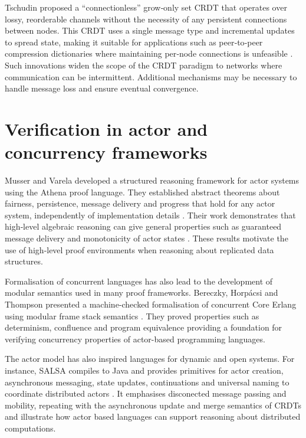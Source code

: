 Tschudin proposed a ``connectionless'' grow‑only set CRDT that operates over lossy, reorderable channels without the necessity of any persistent connections between nodes. This CRDT uses a single message type and incremental updates to spread state, making it suitable for applications such as peer‑to‑peer compression dictionaries where maintaining per‑node connections is unfeasible \cite{tschudin2022connectionless}. Such innovations widen the scope of the CRDT paradigm to networks where communication can be intermittent. Additional mechanisms may be necessary to handle message loss and ensure eventual convergence.


\section{Verification in actor and concurrency frameworks}

Musser and Varela developed a structured reasoning framework for actor systems using the Athena proof language. They established abstract theorems about fairness, persistence, message delivery and progress that hold for any actor system, independently of implementation details \cite{musser2013structured}. Their work demonstrates that high‐level algebraic reasoning can give general properties such as guaranteed message delivery and monotonicity of actor states \cite{musser2013structured}. These results motivate the use of high‑level proof environments when reasoning about replicated data structures.

Formalisation of concurrent languages has also lead to the development of modular semantics used in many proof frameworks. Bereczky, Horpácsi and Thompson presented a machine‑checked formalisation of concurrent Core Erlang using modular frame stack semantics \cite{bereczky2024formalisation}. They proved properties such as determinism, confluence and program equivalence \cite{bereczky2024formalisation} providing a foundation for verifying concurrency properties of actor-based programming languages.

The actor model has also inspired languages for dynamic and open systems. For instance, SALSA compiles to Java and provides primitives for actor creation, asynchronous messaging, state updates, continuations and universal naming to coordinate distributed actors \cite{varela2001programming}. It emphasises disconected message passing and mobility,  repeating with the asynchronous update and merge semantics of CRDTs and illustrate how actor based languages can support reasoning about distributed computations.


